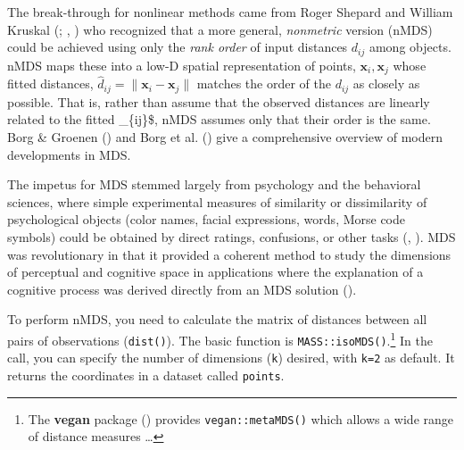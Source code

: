 \documentclass[
  letterpaper,
  10pt,
  krantz2]{krantz}
\begin{document}
The break-through for nonlinear methods came from Roger Shepard and
William Kruskal (;
,
) who recognized that a more general,
\emph{nonmetric} version (nMDS) could be achieved using only the
\emph{rank order} of input distances \(d_{ij}\) among objects. nMDS maps
these into a low-D spatial representation of points,
\(\mathbf{x}_i, \mathbf{x}_j\) whose fitted distances,
\(\hat{d}_{ij} = \lVert\mathbf{x}_i - \mathbf{x}_j\rVert\) matches the
order of the \(d_{ij}\) as closely as possible. That is, rather than
assume that the observed distances are linearly related to the fitted
\_\{ij\}\$, nMDS assumes only that their order is the same. Borg
\& Groenen () and Borg et al.
() give a comprehensive overview of modern
developments in MDS.

The impetus for MDS stemmed largely from psychology and the behavioral
sciences, where simple experimental measures of similarity or
dissimilarity of psychological objects (color names, facial expressions,
words, Morse code symbols) could be obtained by direct ratings,
confusions, or other tasks (, ). MDS was
revolutionary in that it provided a coherent method to study the
dimensions of perceptual and cognitive space in applications where the
explanation of a cognitive process was derived directly from an MDS
solution ().

To perform nMDS, you need to calculate the matrix of distances between
all pairs of observations (\texttt{dist()}). The basic function is
\texttt{MASS::isoMDS()}.\footnote{The \textbf{vegan} package
  () provides
  \texttt{vegan::metaMDS()} which allows a wide range of distance
  measures \ldots{}} In the call, you can specify the number of
dimensions (\texttt{k}) desired, with \texttt{k=2} as default. It
returns the coordinates in a dataset called \texttt{points}.
\end{document}
